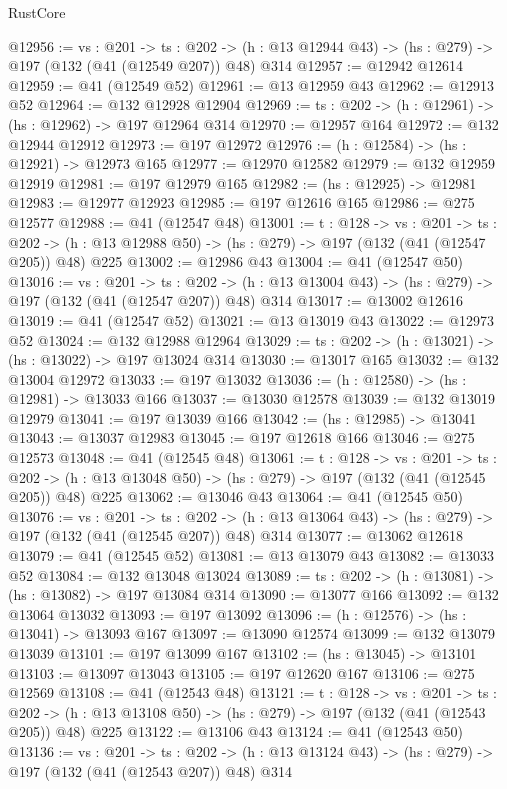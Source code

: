 \begin{lexlean}{RustCore}
\begin{coremodule}
@12956 := {vs : @201} ->
  {ts : @202} -> (h : @13 @12944 @43) -> (hs : @279) -> @197 (@132 (@41 (@12549 @207)) @48) @314
@12957 := @12942 @12614
@12959 := @41 (@12549 @52)
@12961 := @13 @12959 @43
@12962 := @12913 @52
@12964 := @132 @12928 @12904
@12969 := {ts : @202} -> (h : @12961) -> (hs : @12962) -> @197 @12964 @314
@12970 := @12957 @164
@12972 := @132 @12944 @12912
@12973 := @197 @12972
@12976 := (h : @12584) -> (hs : @12921) -> @12973 @165
@12977 := @12970 @12582
@12979 := @132 @12959 @12919
@12981 := @197 @12979 @165
@12982 := (hs : @12925) -> @12981
@12983 := @12977 @12923
@12985 := @197 @12616 @165
@12986 := @275 @12577
@12988 := @41 (@12547 @48)
@13001 := {t : @128} ->
  {vs : @201} ->
  {ts : @202} -> (h : @13 @12988 @50) -> (hs : @279) -> @197 (@132 (@41 (@12547 @205)) @48) @225
@13002 := @12986 @43
@13004 := @41 (@12547 @50)
@13016 := {vs : @201} ->
  {ts : @202} -> (h : @13 @13004 @43) -> (hs : @279) -> @197 (@132 (@41 (@12547 @207)) @48) @314
@13017 := @13002 @12616
@13019 := @41 (@12547 @52)
@13021 := @13 @13019 @43
@13022 := @12973 @52
@13024 := @132 @12988 @12964
@13029 := {ts : @202} -> (h : @13021) -> (hs : @13022) -> @197 @13024 @314
@13030 := @13017 @165
@13032 := @132 @13004 @12972
@13033 := @197 @13032
@13036 := (h : @12580) -> (hs : @12981) -> @13033 @166
@13037 := @13030 @12578
@13039 := @132 @13019 @12979
@13041 := @197 @13039 @166
@13042 := (hs : @12985) -> @13041
@13043 := @13037 @12983
@13045 := @197 @12618 @166
@13046 := @275 @12573
@13048 := @41 (@12545 @48)
@13061 := {t : @128} ->
  {vs : @201} ->
  {ts : @202} -> (h : @13 @13048 @50) -> (hs : @279) -> @197 (@132 (@41 (@12545 @205)) @48) @225
@13062 := @13046 @43
@13064 := @41 (@12545 @50)
@13076 := {vs : @201} ->
  {ts : @202} -> (h : @13 @13064 @43) -> (hs : @279) -> @197 (@132 (@41 (@12545 @207)) @48) @314
@13077 := @13062 @12618
@13079 := @41 (@12545 @52)
@13081 := @13 @13079 @43
@13082 := @13033 @52
@13084 := @132 @13048 @13024
@13089 := {ts : @202} -> (h : @13081) -> (hs : @13082) -> @197 @13084 @314
@13090 := @13077 @166
@13092 := @132 @13064 @13032
@13093 := @197 @13092
@13096 := (h : @12576) -> (hs : @13041) -> @13093 @167
@13097 := @13090 @12574
@13099 := @132 @13079 @13039
@13101 := @197 @13099 @167
@13102 := (hs : @13045) -> @13101
@13103 := @13097 @13043
@13105 := @197 @12620 @167
@13106 := @275 @12569
@13108 := @41 (@12543 @48)
@13121 := {t : @128} ->
  {vs : @201} ->
  {ts : @202} -> (h : @13 @13108 @50) -> (hs : @279) -> @197 (@132 (@41 (@12543 @205)) @48) @225
@13122 := @13106 @43
@13124 := @41 (@12543 @50)
@13136 := {vs : @201} ->
  {ts : @202} -> (h : @13 @13124 @43) -> (hs : @279) -> @197 (@132 (@41 (@12543 @207)) @48) @314

\end{coremodule}
\end{lexlean}
